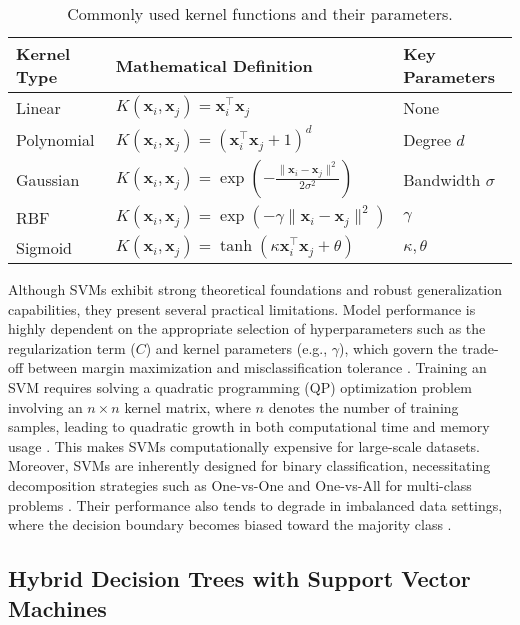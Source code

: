 \begin{table}
\centering
\caption{\label{tab:kernels-tab-static}Commonly used kernel functions and their parameters.}
\centering
\fontsize{7}{9}\selectfont
\begin{tabular}[t]{l|l|l}
\hline
Kernel Type & Mathematical Definition & Key Parameters\\
\hline
Linear & $K(\mathbf{x}_i, \mathbf{x}_j) = \mathbf{x}_i^\top \mathbf{x}_j$ & None\\
\hline
Polynomial & $K(\mathbf{x}_i, \mathbf{x}_j) = (\mathbf{x}_i^\top \mathbf{x}_j + 1)^d$ & Degree $d$\\
\hline
Gaussian & $K(\mathbf{x}_i, \mathbf{x}_j) = \exp\left(-\frac{\|\mathbf{x}_i - \mathbf{x}_j\|^2}{2\sigma^2}\right)$ & Bandwidth $\sigma$\\
\hline
RBF & $K(\mathbf{x}_i, \mathbf{x}_j) = \exp(-\gamma \|\mathbf{x}_i - \mathbf{x}_j\|^2)$ & $\gamma$\\
\hline
Sigmoid & $K(\mathbf{x}_i, \mathbf{x}_j) = \tanh(\kappa \mathbf{x}_i^\top \mathbf{x}_j + \theta)$ & $\kappa, \theta$\\
\hline
\end{tabular}
\end{table}

Although SVMs exhibit strong theoretical foundations and robust generalization capabilities, they present several practical limitations. Model performance is highly dependent on the appropriate selection of hyperparameters such as the regularization term (\(C\)) and kernel parameters (e.g., \(\gamma\)), which govern the trade-off between margin maximization and misclassification tolerance \citep{nanda2018}. Training an SVM requires solving a quadratic programming (QP) optimization problem involving an \(n \times n\) kernel matrix, where \(n\) denotes the number of training samples, leading to quadratic growth in both computational time and memory usage \citep{dong2005}. This makes SVMs computationally expensive for large-scale datasets. Moreover, SVMs are inherently designed for binary classification, necessitating decomposition strategies such as One-vs-One and One-vs-All for multi-class problems \citep{hsu2002}. Their performance also tends to degrade in imbalanced data settings, where the decision boundary becomes biased toward the majority class \citep{cervantes2020}.

\subsection{Hybrid Decision Trees with Support Vector Machines}\label{hybrid-decision-trees-with-support-vector-machines}

